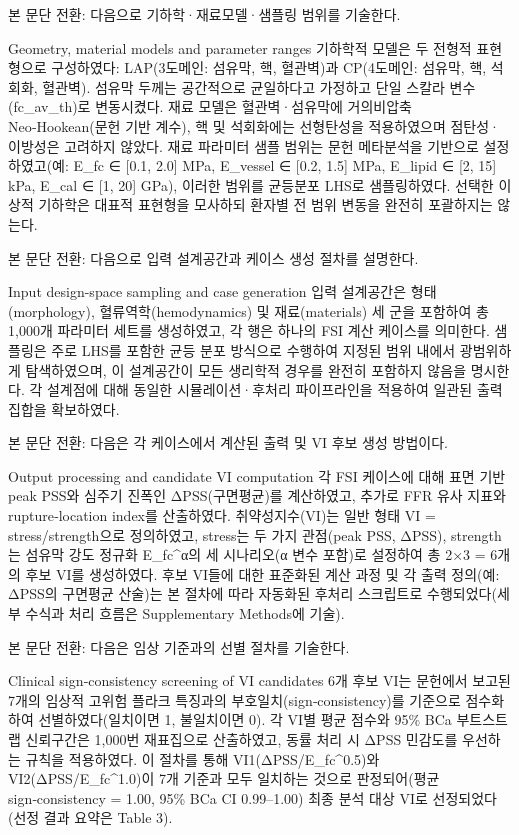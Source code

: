 \documentclass[preprint,12pt]{elsarticle}
\begin{document}
본 문단 전환: 다음으로 기하학·재료모델·샘플링 범위를 기술한다.

Geometry, material models and parameter ranges
기하학적 모델은 두 전형적 표현형으로 구성하였다: LAP(3도메인: 섬유막, 핵, 혈관벽)과 CP(4도메인: 섬유막, 핵, 석회화, 혈관벽). 섬유막 두께는 공간적으로 균일하다고 가정하고 단일 스칼라 변수(fc\_av\_th)로 변동시켰다. 재료 모델은 혈관벽·섬유막에 거의비압축 Neo‑Hookean(문헌 기반 계수), 핵 및 석회화에는 선형탄성을 적용하였으며 점탄성·이방성은 고려하지 않았다. 재료 파라미터 샘플 범위는 문헌 메타분석을 기반으로 설정하였고(예: E\_fc ∈ [0.1, 2.0] MPa, E\_vessel ∈ [0.2, 1.5] MPa, E\_lipid ∈ [2, 15] kPa, E\_cal ∈ [1, 20] GPa), 이러한 범위를 균등분포 LHS로 샘플링하였다. 선택한 이상적 기하학은 대표적 표현형을 모사하되 환자별 전 범위 변동을 완전히 포괄하지는 않는다.

본 문단 전환: 다음으로 입력 설계공간과 케이스 생성 절차를 설명한다.

Input design-space sampling and case generation
입력 설계공간은 형태(morphology), 혈류역학(hemodynamics) 및 재료(materials) 세 군을 포함하여 총 1,000개 파라미터 세트를 생성하였고, 각 행은 하나의 FSI 계산 케이스를 의미한다. 샘플링은 주로 LHS를 포함한 균등 분포 방식으로 수행하여 지정된 범위 내에서 광범위하게 탐색하였으며, 이 설계공간이 모든 생리학적 경우를 완전히 포함하지 않음을 명시한다. 각 설계점에 대해 동일한 시뮬레이션·후처리 파이프라인을 적용하여 일관된 출력 집합을 확보하였다.

본 문단 전환: 다음은 각 케이스에서 계산된 출력 및 VI 후보 생성 방법이다.

Output processing and candidate VI computation
각 FSI 케이스에 대해 표면 기반 peak PSS와 심주기 진폭인 ΔPSS(구면평균)를 계산하였고, 추가로 FFR 유사 지표와 rupture‑location index를 산출하였다. 취약성지수(VI)는 일반 형태 VI = stress/strength으로 정의하였고, stress는 두 가지 관점(peak PSS, ΔPSS), strength는 섬유막 강도 정규화 E\_fc\textasciicircum α의 세 시나리오(α 변수 포함)로 설정하여 총 2×3 = 6개의 후보 VI를 생성하였다. 후보 VI들에 대한 표준화된 계산 과정 및 각 출력 정의(예: ΔPSS의 구면평균 산술)는 본 절차에 따라 자동화된 후처리 스크립트로 수행되었다(세부 수식과 처리 흐름은 Supplementary Methods에 기술).

본 문단 전환: 다음은 임상 기준과의 선별 절차를 기술한다.

Clinical sign‑consistency screening of VI candidates
6개 후보 VI는 문헌에서 보고된 7개의 임상적 고위험 플라크 특징과의 부호일치(sign‑consistency)를 기준으로 점수화하여 선별하였다(일치이면 1, 불일치이면 0). 각 VI별 평균 점수와 95\% BCa 부트스트랩 신뢰구간은 1,000번 재표집으로 산출하였고, 동률 처리 시 ΔPSS 민감도를 우선하는 규칙을 적용하였다. 이 절차를 통해 VI1(ΔPSS/E\_fc\textasciicircum 0.5)와 VI2(ΔPSS/E\_fc\textasciicircum 1.0)이 7개 기준과 모두 일치하는 것으로 판정되어(평균 sign‑consistency = 1.00, 95\% BCa CI 0.99–1.00) 최종 분석 대상 VI로 선정되었다(선정 결과 요약은 Table 3).
\end{document}
